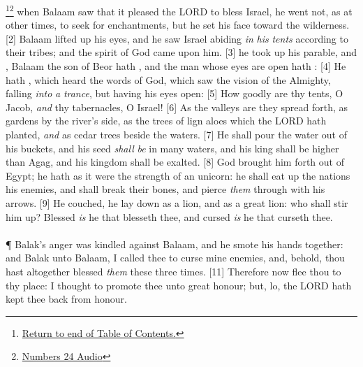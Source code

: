 \footnote{\textcolor[rgb]{0.00,0.25,0.00}{\hyperlink{NumbersTOC}{Return to end of Table of Contents.}}}\footnote{\href{https://audiobible.com/bible/numbers_24.html}{\textcolor[cmyk]{0.99998,1,0,0}{Numbers 24 Audio}}}\textcolor[cmyk]{0.99998,1,0,0}{ when Balaam saw that it pleased the LORD to bless Israel, he went not, as at other times, to seek for enchantments, but he set his face toward the wilderness.}
[2] \textcolor[cmyk]{0.99998,1,0,0}{ Balaam lifted up his eyes, and he saw Israel abiding \emph{in} \emph{his} \emph{tents} according to their tribes; and the spirit of God came upon him.}
[3] \textcolor[cmyk]{0.99998,1,0,0}{ he took up his parable, and , Balaam the son of Beor hath , and the man whose eyes are open hath :}
[4] \textcolor[cmyk]{0.99998,1,0,0}{He hath , which heard the words of God, which saw the vision of the Almighty, falling \emph{into} \emph{a} \emph{trance}, but having his eyes open:}
[5] \textcolor[cmyk]{0.99998,1,0,0}{How goodly are thy tents, O Jacob, \emph{and} thy tabernacles, O Israel!}
[6] \textcolor[cmyk]{0.99998,1,0,0}{As the valleys are they spread forth, as gardens by the river's side, as the trees of lign aloes which the LORD hath planted, \emph{and} as cedar trees beside the waters.}
[7] \textcolor[cmyk]{0.99998,1,0,0}{He shall pour the water out of his buckets, and his seed \emph{shall} \emph{be} in many waters, and his king shall be higher than Agag, and his kingdom shall be exalted.}
[8] \textcolor[cmyk]{0.99998,1,0,0}{God brought him forth out of Egypt; he hath as it were the strength of an unicorn: he shall eat up the nations his enemies, and shall break their bones, and pierce \emph{them} through with his arrows.}
[9] \textcolor[cmyk]{0.99998,1,0,0}{He couched, he lay down as a lion, and as a great lion: who shall stir him up? Blessed \emph{is} he that blesseth thee, and cursed \emph{is} he that curseth thee.}\\
\\
\P \textcolor[cmyk]{0.99998,1,0,0}{ Balak's anger was kindled against Balaam, and he smote his hands together: and Balak  unto Balaam, I called thee to curse mine enemies, and, behold, thou hast altogether blessed \emph{them} these three times.}
[11] \textcolor[cmyk]{0.99998,1,0,0}{Therefore now flee thou to thy place: I thought to promote thee unto great honour; but, lo, the LORD hath kept thee back from honour.}
